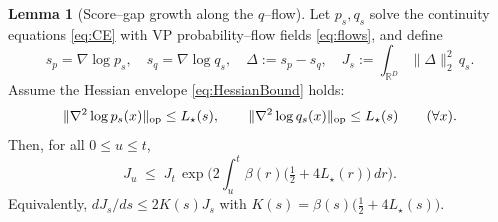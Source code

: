 \documentclass[12pt]{article}
\theoremstyle{definition} %
\newtheorem{lemma}{Lemma}
\newcommand{\R}{\mathbb{R}}
\begin{document}
\begin{lemma}[Score--gap growth along the $q$--flow]\label{lem:score_growth}
Let $p_s,q_s$ solve the continuity equations \eqref{eq:CE} with VP probability--flow fields \eqref{eq:flows},
and define
\[
s_p=\nabla\log p_s,\quad s_q=\nabla\log q_s,\quad \Delta:=s_p-s_q,\quad
J_s:=\int_{\R^D}\|\Delta\|_2^2\,q_s.
\]
Assume the Hessian envelope \eqref{eq:HessianBound} holds:
\[
\|\nabla^2\log p_s(x)\|_{\rm op}\le L_\star(s),\qquad
\|\nabla^2\log q_s(x)\|_{\rm op}\le L_\star(s)\qquad(\forall x).
\]
Then, for all $0\le u\le t$,
\begin{equation}\label{eq:J-growth-new}
J_u \;\le\; J_t\,
\exp\!\Big(2\int_u^t \beta(r)\big(\tfrac12+4L_\star(r)\big)\,dr\Big).
\end{equation}
Equivalently, $dJ_s/ds \le 2K(s)J_s$ with $K(s)=\beta(s)\big(\tfrac12+4L_\star(s)\big)$.
\end{lemma}
\end{document}
